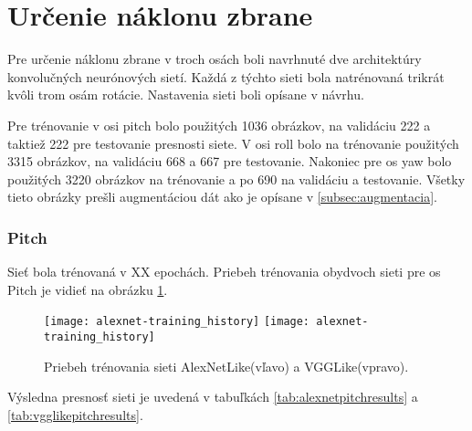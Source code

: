 
\section{Určenie náklonu zbrane}
Pre určenie náklonu zbrane v troch osách boli navrhnuté dve architektúry konvolučných neurónových sietí.
Každá z týchto sieti bola natrénovaná trikrát kvôli trom osám rotácie.
Nastavenia sieti boli opísane v návrhu.

Pre trénovanie v osi pitch bolo použitých 1036 obrázkov, na validáciu 222 a taktiež 222 pre testovanie presnosti siete.
V osi roll bolo na trénovanie použitých 3315 obrázkov, na validáciu 668 a 667 pre testovanie.
Nakoniec pre os yaw bolo použitých 3220 obrázkov na trénovanie a po 690 na validáciu a testovanie.
Všetky tieto obrázky prešli augmentáciou dát ako je opísane v \ref{subsec:augmentacia}.

\subsubsection{Pitch}
Sieť bola trénovaná v XX epochách.
Priebeh trénovania obydvoch sieti pre os Pitch je vidieť na obrázku \ref{pic:pitchaxis}.

\begin{figure}[H]
    \centering
    \texttt{[image: alexnet-training\_history]} %
    \quad
	\texttt{[image: alexnet-training\_history]} %
	\caption{Priebeh trénovania sieti AlexNetLike(vľavo) a VGGLike(vpravo).}
	\label{pic:pitchaxis}
\end{figure}

Výsledna presnosť sieti je uvedená v tabuľkách \ref{tab:alexnetpitchresults} a \ref{tab:vgglikepitchresults}.

